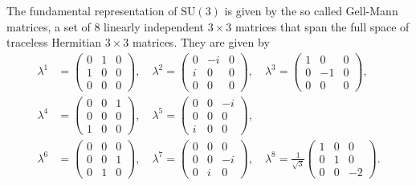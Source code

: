 \noindent The fundamental representation of $\text{SU}(3)$ is given by the so called Gell-Mann matrices, a set of 8 linearly independent $3\times3$ matrices that span the full space of traceless Hermitian $3\times 3$ matrices. They are given by
\begin{align*}
    \lambda^1 &= 
    \begin{pmatrix}
    0 & 1 & 0 \\
    1 & 0 & 0\\
    0 & 0 & 0
    \end{pmatrix},
    \quad
    \lambda^2 = 
    \begin{pmatrix}
    0 & -i & 0 \\
    i & 0 & 0\\
    0 & 0 & 0
    \end{pmatrix},
    \quad
    \lambda^3 = 
    \begin{pmatrix}
    1 & 0 & 0 \\
    0 & -1 & 0\\
    0 & 0 & 0
    \end{pmatrix},\\
    \lambda^4 &= 
    \begin{pmatrix}
    0 & 0 & 1 \\
    0 & 0 & 0\\
    1 & 0 & 0
    \end{pmatrix},
    \quad
    \lambda^5 = 
    \begin{pmatrix}
    0 & 0 & -i \\
    0 & 0 & 0\\
    i & 0 & 0
    \end{pmatrix},\\
    \lambda^6 &= 
    \begin{pmatrix}
    0 & 0 & 0 \\
    0 & 0 & 1\\
    0 & 1 & 0
    \end{pmatrix},
    \quad
    \lambda^7 = 
    \begin{pmatrix}
    0 & 0 & 0 \\
    0 & 0 & -i\\
    0 & i & 0
    \end{pmatrix},
    \quad
    \lambda^8 = \frac{1}{\sqrt{3}}
    \begin{pmatrix}
    1 & 0 & 0 \\
    0 & 1 & 0\\
    0 & 0 & -2
    \end{pmatrix}.
\end{align*}
